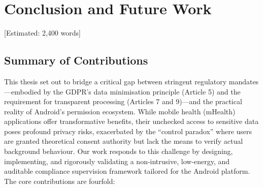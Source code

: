 \newpage\section{Conclusion and Future Work} [Estimated: 2,400 words]

\subsection{Summary of Contributions}
This thesis set out to bridge a critical gap between stringent regulatory mandates—embodied by the GDPR's data minimisation principle (Article 5) and the requirement for transparent processing (Articles 7 and 9)—and the practical reality of Android's permission ecosystem. While mobile health (mHealth) applications offer transformative benefits, their unchecked access to sensitive data poses profound privacy risks, exacerbated by the ``control paradox'' where users are granted theoretical consent authority but lack the means to verify actual background behaviour. Our work responds to this challenge by designing, implementing, and rigorously validating a non‑intrusive, low‑energy, and auditable compliance supervision framework tailored for the Android platform. The core contributions are fourfold:

